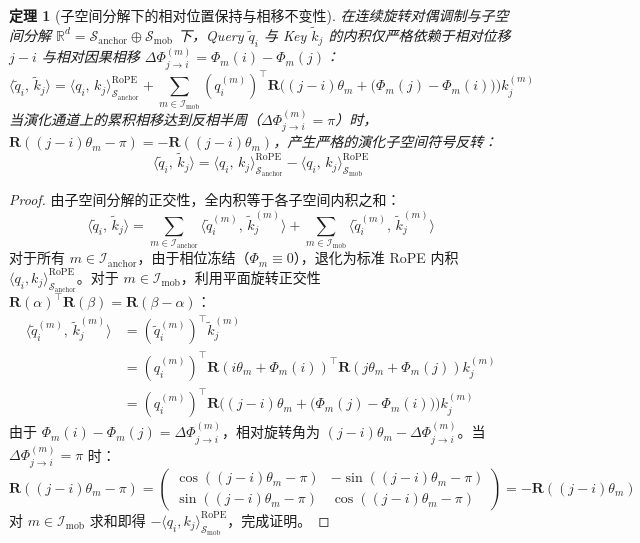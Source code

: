 \documentclass[11pt,a4paper]{article}
\newtheorem{theorem}{定理}
\theoremstyle{definition}
\begin{document}
\begin{theorem}[子空间分解下的相对位置保持与相移不变性]
\label{thm:trans_inv}
在连续旋转对偶调制与子空间分解 $\mathbb{R}^d = \mathcal{S}_{\text{anchor}} \oplus \mathcal{S}_{\text{mob}}$ 下，Query $\tilde{q}_i$ 与 Key $\tilde{k}_j$ 的内积仅严格依赖于相对位移 $j - i$ 与相对因果相移 $\Delta \Phi_{j \to i}^{(m)} = \Phi_m(i) - \Phi_m(j)$：
\begin{equation}
\langle \tilde{q}_i, \, \tilde{k}_j \rangle = \langle q_i, \, k_j \rangle_{\mathcal{S}_{\text{anchor}}}^{\mathrm{RoPE}} + \sum_{m \in \mathcal{I}_{\text{mob}}} (q_i^{(m)})^\top \mathbf{R}\Big( (j - i)\theta_m + \big(\Phi_m(j) - \Phi_m(i)\big) \Big) k_j^{(m)}
\end{equation}
当演化通道上的累积相移达到反相半周（$\Delta \Phi_{j \to i}^{(m)} = \pi$）时，$\mathbf{R}((j - i)\theta_m - \pi) = -\mathbf{R}((j - i)\theta_m)$，产生严格的演化子空间符号反转：
\begin{equation}
\langle \tilde{q}_i, \, \tilde{k}_j \rangle = \langle q_i, \, k_j \rangle_{\mathcal{S}_{\text{anchor}}}^{\mathrm{RoPE}} - \langle q_i, \, k_j \rangle_{\mathcal{S}_{\text{mob}}}^{\mathrm{RoPE}}
\end{equation}
\end{theorem}
\begin{proof}
由子空间分解的正交性，全内积等于各子空间内积之和：
\begin{equation}
\langle \tilde{q}_i, \, \tilde{k}_j \rangle = \sum_{m \in \mathcal{I}_{\text{anchor}}} \langle \tilde{q}_i^{(m)}, \, \tilde{k}_j^{(m)} \rangle + \sum_{m \in \mathcal{I}_{\text{mob}}} \langle \tilde{q}_i^{(m)}, \, \tilde{k}_j^{(m)} \rangle
\end{equation}
对于所有 $m \in \mathcal{I}_{\text{anchor}}$，由于相位冻结（$\Phi_m \equiv 0$），退化为标准 RoPE 内积 $\langle q_i, k_j \rangle_{\mathcal{S}_{\text{anchor}}}^{\mathrm{RoPE}}$。对于 $m \in \mathcal{I}_{\text{mob}}$，利用平面旋转正交性 $\mathbf{R}(\alpha)^\top \mathbf{R}(\beta) = \mathbf{R}(\beta - \alpha)$：
\begin{align}
\langle \tilde{q}_i^{(m)}, \, \tilde{k}_j^{(m)} \rangle &= (\tilde{q}_i^{(m)})^\top \tilde{k}_j^{(m)} \nonumber \\
&= (q_i^{(m)})^\top \mathbf{R}(i\theta_m + \Phi_m(i))^\top \mathbf{R}(j\theta_m + \Phi_m(j)) k_j^{(m)} \nonumber \\
&= (q_i^{(m)})^\top \mathbf{R}\Big( (j - i)\theta_m + \big(\Phi_m(j) - \Phi_m(i)\big) \Big) k_j^{(m)}
\end{align}
由于 $\Phi_m(i) - \Phi_m(j) = \Delta \Phi_{j \to i}^{(m)}$，相对旋转角为 $(j - i)\theta_m - \Delta \Phi_{j \to i}^{(m)}$。当 $\Delta \Phi_{j \to i}^{(m)} = \pi$ 时：
\begin{equation}
\mathbf{R}((j - i)\theta_m - \pi) = \begin{pmatrix} \cos((j-i)\theta_m - \pi) & -\sin((j-i)\theta_m - \pi) \\ \sin((j-i)\theta_m - \pi) & \cos((j-i)\theta_m - \pi) \end{pmatrix} = -\mathbf{R}((j - i)\theta_m)
\end{equation}
对 $m \in \mathcal{I}_{\text{mob}}$ 求和即得 $-\langle q_i, k_j \rangle_{\mathcal{S}_{\text{mob}}}^{\mathrm{RoPE}}$，完成证明。
\end{proof}
\end{document}
